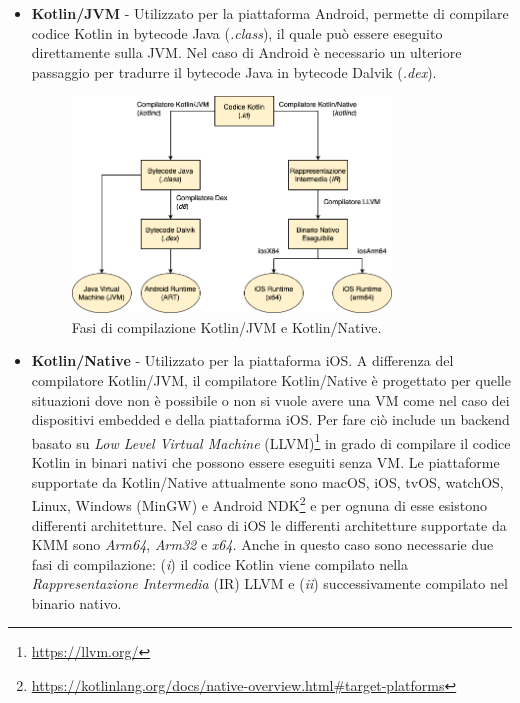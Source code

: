 \begin{itemize}
    \item \textbf{Kotlin/JVM} - Utilizzato per la piattaforma Android, permette di compilare codice Kotlin in bytecode Java (\textit{.class}), il quale può essere eseguito direttamente sulla JVM. Nel caso di Android è necessario un ulteriore passaggio per tradurre il bytecode Java in bytecode Dalvik (\textit{.dex}).

    \begin{figure}[H]
        \centering
        \includegraphics[width=0.8\textwidth]{img/compilatore_kotlin.png}
        \caption{Fasi di compilazione Kotlin/JVM e Kotlin/Native.}
    \end{figure}

    \item \textbf{Kotlin/Native} - Utilizzato per la piattaforma iOS. A differenza del compilatore Kotlin/JVM, il compilatore Kotlin/Native è progettato per quelle situazioni dove non è possibile o non si vuole avere una VM come nel caso dei dispositivi embedded e della piattaforma iOS. Per fare ciò include un backend basato su \textit{Low Level Virtual Machine} (LLVM)\footnote{\href{https://llvm.org/}{https://llvm.org/}} in grado di compilare il codice Kotlin in binari nativi che possono essere eseguiti senza VM\cite{nagy2022simplifying}. Le piattaforme supportate da Kotlin/Native attualmente sono macOS, iOS, tvOS, watchOS, Linux, Windows (MinGW) e Android NDK\footnote{\href{https://kotlinlang.org/docs/native-overview.html\#target-platforms}{https://kotlinlang.org/docs/native-overview.html\#target-platforms}} e per ognuna di esse esistono differenti architetture. Nel caso di iOS le differenti architetture supportate da KMM sono \textit{Arm64}, \textit{Arm32} e \textit{x64}. Anche in questo caso sono necessarie due fasi di compilazione: (\textit{i}) il codice Kotlin viene compilato nella \textit{Rappresentazione Intermedia} (IR) LLVM e (\textit{ii}) successivamente compilato nel binario nativo.
\end{itemize}

